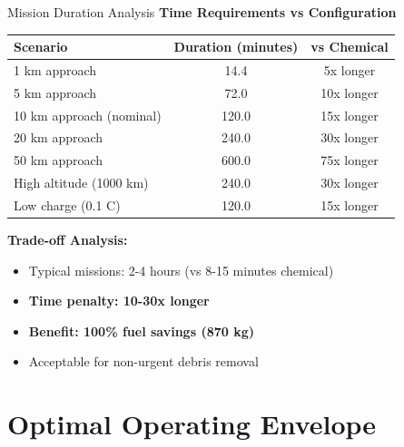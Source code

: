 \documentclass[aspectratio=169]{beamer}
\begin{document}
\begin{frame}{Mission Duration Analysis}
\textbf{Time Requirements vs Configuration}

\vspace{0.5em}
\begin{table}
\footnotesize
\begin{tabular}{lcc}
\toprule
\textbf{Scenario} & \textbf{Duration (minutes)} & \textbf{vs Chemical} \\
\midrule
1 km approach & 14.4 & 5x longer \\
5 km approach & 72.0 & 10x longer \\
10 km approach (nominal) & 120.0 & 15x longer \\
20 km approach & 240.0 & 30x longer \\
50 km approach & 600.0 & 75x longer \\
High altitude (1000 km) & 240.0 & 30x longer \\
Low charge (0.1 C) & 120.0 & 15x longer \\
\bottomrule
\end{tabular}
\end{table}

\vspace{1em}
\textbf{Trade-off Analysis:}
\begin{itemize}
    \item Typical missions: 2-4 hours (vs 8-15 minutes chemical)
    \item \textbf{Time penalty: 10-30x longer}
    \item \textbf{Benefit: 100\% fuel savings (870 kg)}
    \item Acceptable for non-urgent debris removal
\end{itemize}
\end{frame}

\section{Optimal Operating Envelope}
\end{document}
